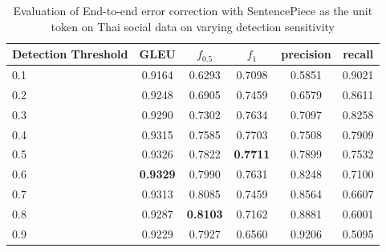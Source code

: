\begin{table}
  \caption{Evaluation of End-to-end error correction with SentencePiece as the unit token on Thai social data on varying detection sensitivity}
  \label{tab:e2e_detect_sense}
  \begin{tabular}{lccccc}
    \toprule
    Detection Threshold & GLEU & $f_{0.5}$ & $f_1$ & precision & recall \\
    \midrule
    0.1 & 0.9164 & 0.6293 & 0.7098 & 0.5851 & 0.9021 \\
    0.2 & 0.9248 & 0.6905 & 0.7459 & 0.6579 & 0.8611 \\
    0.3 & 0.9290 & 0.7302 & 0.7634 & 0.7097 & 0.8258 \\
    0.4 & 0.9315 & 0.7585 & 0.7703 & 0.7508 & 0.7909 \\
    0.5 & 0.9326 & 0.7822 & \textbf{0.7711} & 0.7899 & 0.7532 \\
    0.6 & \textbf{0.9329} & 0.7990 & 0.7631 & 0.8248 & 0.7100 \\
    0.7 & 0.9313 & 0.8085 & 0.7459 & 0.8564 & 0.6607 \\
0.8 & 0.9287 & \textbf{0.8103} & 0.7162 & 0.8881 & 0.6001 \\
    0.9 & 0.9229 & 0.7927 & 0.6560 & 0.9206 & 0.5095 \\
    \bottomrule
\end{tabular}
\end{table}

